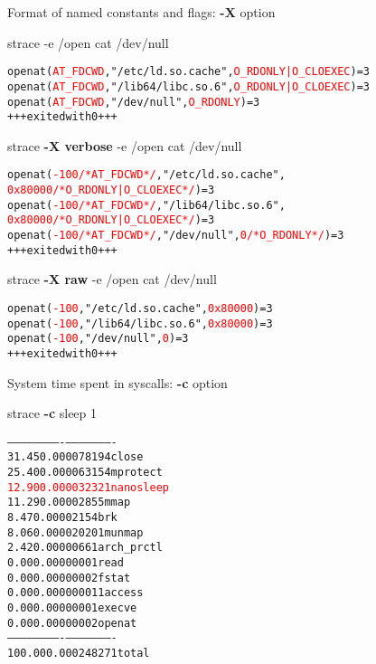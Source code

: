 \documentclass[unicode]{beamer}
\begin{document}
\begin{frame}[fragile]{Format of named constants and flags: \textbf{-X} option}
\begin{block}{\large strace -e /open cat /dev/null}
\scriptsize
\begin{alltt}
openat(\textcolor{red}{AT_FDCWD}, "/etc/ld.so.cache", \textcolor{red}{O_RDONLY|O_CLOEXEC}) = 3
openat(\textcolor{red}{AT_FDCWD}, "/lib64/libc.so.6", \textcolor{red}{O_RDONLY|O_CLOEXEC}) = 3
openat(\textcolor{red}{AT_FDCWD}, "/dev/null", \textcolor{red}{O_RDONLY}) = 3
+++ exited with 0 +++
\end{alltt}
\end{block}

\begin{block}{\large strace \textbf{-X verbose} -e /open cat /dev/null}
\scriptsize
\begin{alltt}
openat(\textcolor{red}{-100 /* AT_FDCWD */}, "/etc/ld.so.cache",
       \textcolor{red}{0x80000 /* O_RDONLY|O_CLOEXEC */}) = 3
openat(\textcolor{red}{-100 /* AT_FDCWD */}, "/lib64/libc.so.6",
       \textcolor{red}{0x80000 /* O_RDONLY|O_CLOEXEC */}) = 3
openat(\textcolor{red}{-100 /* AT_FDCWD */}, "/dev/null", \textcolor{red}{0 /* O_RDONLY */}) = 3
+++ exited with 0 +++
\end{alltt}
\end{block}

\begin{block}{\large strace \textbf{-X raw} -e /open cat /dev/null}
\scriptsize
\begin{alltt}
openat(\textcolor{red}{-100}, "/etc/ld.so.cache", \textcolor{red}{0x80000}) = 3
openat(\textcolor{red}{-100}, "/lib64/libc.so.6", \textcolor{red}{0x80000}) = 3
openat(\textcolor{red}{-100}, "/dev/null", \textcolor{red}{0})            = 3
+++ exited with 0 +++
\end{alltt}
\end{block}
\end{frame}

\begin{frame}[fragile]{System time spent in syscalls: \textbf{-c} option}
\begin{block}{\large strace \textbf{-c} sleep 1}
\begin{alltt}
% time  seconds usecs/call calls errors syscall
------ -------- ---------- ----- ------ ----------
 31.45 0.000078         19     4        close
 25.40 0.000063         15     4        mprotect
\textcolor{red}{ 12.90 0.000032         32     1        nanosleep}
 11.29 0.000028          5     5        mmap
  8.47 0.000021          5     4        brk
  8.06 0.000020         20     1        munmap
  2.42 0.000006          6     1        arch_prctl
  0.00 0.000000          0     1        read
  0.00 0.000000          0     2        fstat
  0.00 0.000000          0     1      1 access
  0.00 0.000000          0     1        execve
  0.00 0.000000          0     2        openat
------ -------- ---------- ----- ------ ----------
100.00 0.000248               27      1 total
\end{alltt}
\end{block}
\end{frame}
\end{document}
